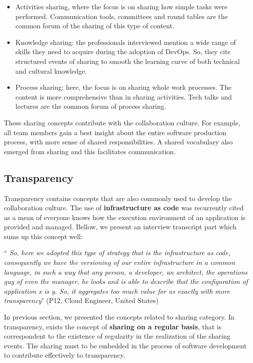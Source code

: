 \begin{itemize}
\item Activities sharing, where the focus is on sharing how simple tasks were
performed. Communication tools, committees and round tables are the common
forum of the sharing of this type of content.
\item Knowledge sharing: the professionals interviewed mention a wide range of
skills they need to acquire during the adoption of DevOps. So, they cite
structured events of sharing to smooth the learning curve of both technical and
cultural knowledge.
\item Process sharing: here, the focus is on sharing whole work processes. The
content is more comprehensive than in sharing activities. Tech talks and
lectures are the common forum of process sharing.
\end{itemize}

These sharing concepts contribute with the collaboration culture. For example,
all team members gain a best insight about the entire software production
process, with more sense of shared responsibilities. A shared vocabulary also
emerged from sharing and this facilitates communication.

\subsection{Transparency}

Transparency contains concepts that are also commonly used to develop the
collaboration culture. The use of \textbf{infrastructure as code} was
recurrently cited as a mean of everyone knows how the execution environment of
an application is provided and managed. Bellow, we present an interview
transcript part which sums up this concept well:

\begin{mq}
``\emph{
So, here we adopted this type of strategy that is the infrastructure as code,
consequently we have the versioning of our entire infrastructure in a common
language, in such a way that any person, a developer, an architect, the
operations guy of even the manager, he looks and is able to describe that the
configuration of application x is y. So, it aggregates too much value for us
exactly with more transparency}" (P12, Cloud Engineer, United States)
\end{mq}

In previous section, we presented the concepts related to sharing category. In
transparency, exists the concept of \textbf{sharing on a regular basis}, that
is correspondent to the existence of regularity in the realization of the
sharing events. The sharing must to be embedded in the process of software
development to contribute effectively to transparency.

